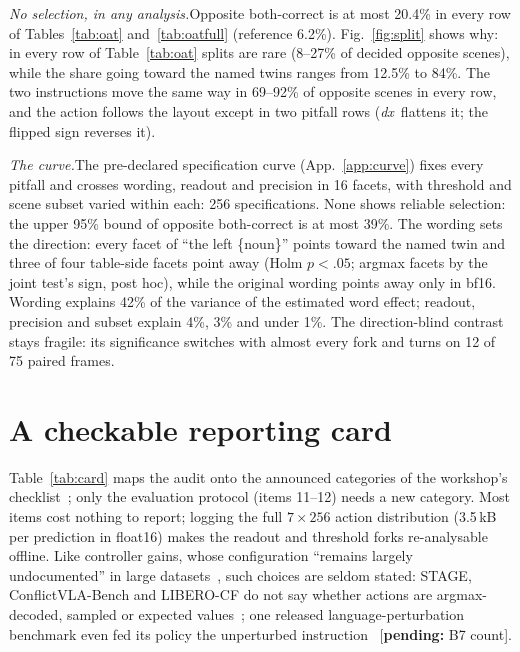 \documentclass[conference]{IEEEtran}
\newcommand{\pending}[1]{\textcolor{orange!85!black}{[\textbf{pending:} #1]}}
\newcommand{\dx}{\textit{dx}}
\newcommand{\head}[1]{\textit{#1}\hspace{0.4em}}
\begin{document}
\head{No selection, in any analysis.}Opposite both-correct is at most 20.4\% in every row of Tables~\ref{tab:oat} and~\ref{tab:oatfull} (reference 6.2\%). Fig.~\ref{fig:split} shows why: in every row of Table~\ref{tab:oat} splits are rare (8--27\% of decided opposite scenes), while the share going toward the named twins ranges from 12.5\% to 84\%. The two instructions move the same way in 69--92\% of opposite scenes in every row, and the action follows the layout except in two pitfall rows (\dx\ flattens it; the flipped sign reverses it).

\head{The curve.}The pre-declared specification curve (App.~\ref{app:curve}) fixes every pitfall and crosses wording, readout and precision in 16 facets, with threshold and scene subset varied within each: 256 specifications. None shows reliable selection: the upper 95\% bound of opposite both-correct is at most 39\%. The wording sets the direction: every facet of ``the left \{noun\}'' points toward the named twin and three of four table-side facets point away (Holm $p<.05$; argmax facets by the joint test's sign, post hoc), while the original wording points away only in bf16. Wording explains 42\% of the variance of the estimated word effect; readout, precision and subset explain 4\%, 3\% and under 1\%. The direction-blind contrast stays fragile: its significance switches with almost every fork and turns on 12 of 75 paired frames.

\section{A checkable reporting card}
\label{sec:card}

Table~\ref{tab:card} maps the audit onto the announced categories of the workshop's checklist~\cite{park2026everything}; only the evaluation protocol (items 11--12) needs a new category. Most items cost nothing to report; logging the full $7\times256$ action distribution (3.5\,kB per prediction in float16) makes the readout and threshold forks re-analysable offline. Like controller gains, whose configuration ``remains largely undocumented'' in large datasets~\cite{bronars2026tune}, such choices are seldom stated: STAGE, ConflictVLA-Bench and LIBERO-CF do not say whether actions are argmax-decoded, sampled or expected values~\cite{jin2026stage,hou2026conflictvla,fang2026liberocf}; one released language-perturbation benchmark even fed its policy the unperturbed instruction~\cite{chen2026instructions} \pending{B7 count}.
\end{document}
